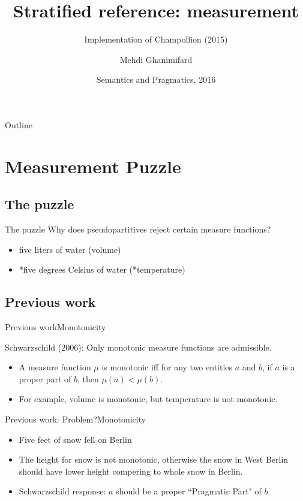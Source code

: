 \documentclass{beamer}
\title{Stratified reference: measurement}
\subtitle{Implementation of Champollion (2015)}
\author{Mehdi Ghanimifard}
\institute %
{University of Gothenburg}
\date{Semantics and Pragmatics, 2016}
\begin{document}
\begin{frame}
  \titlepage
\end{frame}

\begin{frame}{Outline}
  \tableofcontents
\end{frame}

\section{Measurement Puzzle}

\subsection{The puzzle}

\begin{frame}{The puzzle}
Why does pseudopartitives reject certain measure functions? 
  \begin{itemize}
  \item {
    five liters of water (volume)
  }
  \item {
    *five degrees Celsius of water (*temperature)
  }
  \end{itemize}
\end{frame}

\subsection{Previous work}

\begin{frame}{Previous work}{Monotonicity}

Schwarzschild (2006): Only \alert{monotonic} measure functions are admissible.

  \begin{itemize}
  \item {
    A measure function $\mu$ is monotonic iff for any two entities $a$ and $b$, if $a$ is a proper part of $b$, then $\mu(a) < \mu(b)$.
    \pause 
  }
  \item {   
    For example, volume is monotonic, but temperature is not monotonic.
  }
  \end{itemize}
\end{frame}

\begin{frame}{Previous work: Problem?}{Monotonicity}

  \begin{itemize}
  \item {   
    Five feet of snow fell on Berlin
  }
  \item {   
    The height for snow is not monotonic, otherwise the snow in West Berlin should have lower height compering to whole snow in Berlin.
  }
  \item {   
    Schwarzschild response: $a$ should be a proper ``Pragmatic Part" of $b$.
  }
  \end{itemize}
  
\end{frame}
\end{document}

